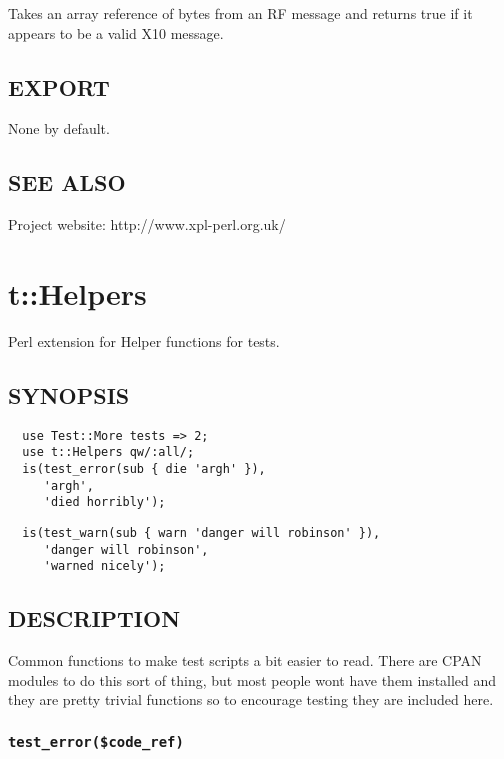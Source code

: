 \documentclass[12pt,a4paper]{article}
\begin{document}
Takes an array reference of bytes from an RF message and returns true
if it appears to be a valid X10 message.

\subsection*{EXPORT\label{xPL::X10_EXPORT}}


None by default.

\subsection*{SEE ALSO\label{xPL::X10_SEE_ALSO}}


Project website: http://www.xpl-perl.org.uk/

\newpage
\section{t::Helpers\label{t::Helpers}}


Perl extension for Helper functions for tests.

\subsection*{SYNOPSIS\label{t::Helpers_SYNOPSIS}}
\begin{verbatim}
  use Test::More tests => 2;
  use t::Helpers qw/:all/;
  is(test_error(sub { die 'argh' }),
     'argh',
     'died horribly');
\end{verbatim}
\begin{verbatim}
  is(test_warn(sub { warn 'danger will robinson' }),
     'danger will robinson',
     'warned nicely');
\end{verbatim}
\subsection*{DESCRIPTION\label{t::Helpers_DESCRIPTION}}


Common functions to make test scripts a bit easier to read.  There are
CPAN modules to do this sort of thing, but most people wont have them
installed and they are pretty trivial functions so to encourage
testing they are included here.

\subsubsection*{\texttt{test\_error(\$code\_ref)}\label{t::Helpers_test_error_code_ref_}}
\end{document}
